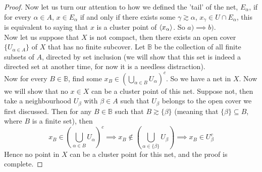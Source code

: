 \documentclass[../../main.tex]{subfiles}
\begin{document}
\begin{proof}
Now let us turn our attention to how we defined the 'tail' of the net, $E_\alpha$, if for every $\alpha\in A$, $x\in E_\alpha$ if and only if there exists some $\gamma\gtrsim\alpha$, $x_\gamma\in U\cap E_\alpha$, this is equivalent to saying that $x$ is a cluster point of $\langle {x_\alpha} \rangle$. So $a)\implies b)$.\\

Now let us suppose that $X$ is not compact, then there exists an open cover $\{U_{\alpha\in A}\}$ of $X$ that has no finite subcover. Let $\mathbb{B}$ be the collection of all finite subsets of $A$, directed by set inclusion (we will show that this set is indeed a directed set at another time, for now it is a needless distraction).\\

Now for every $B\in\mathbb{B}$, find some $x_B\in \left(\bigcup_{\alpha\in B} U_\alpha\right)^c$. So we have a net in $X$. Now we will show that no $x\in X$ can be a cluster point of this net. Suppose not, then take a neighbourhood $U_\beta$ with $\beta\in A$ such that $U_\beta$ belongs to the open cover we first discussed. Then for any $B\in \mathbb{B}$ such that $B\gtrsim\{\beta\}$ (meaning that $\{\beta\}\subseteq B$, where $B$ is a finite set), then
\[
x_B\in\left(\bigcup_{\alpha\in B}U_\alpha\right)^c\implies x_B\notin\left(\bigcup_{\alpha\in \{\beta\}}U_\beta\right)\implies x_B\in U_\beta^c
\]
Hence no point in $X$ can be a cluster point for this net, and the proof is complete.
\end{proof}
\end{document}
